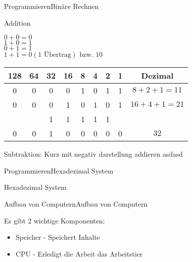 \begin{frame}{Programmieren}{Binäre Rechnen}
	
	Addition %

	$0 + 0 = 0$	\\
	$1 + 0 = 1$	\\
	$0 + 1 = 1$	\\
	$1 + 1 = 0 (1 \text{ Übertrag}) \text{ bzw. } 10$	
	
	 
	\begin{tabular}{cccccccc|c}
		128 & 64 & 32 & 16 & 8 & 4 & 2 & 1 & Dezimal \\ \hline 
		0   & 0  & 0  & 0  & 1 & 0 & 1 & 1 & $8 + 2 + 1 = 11$ \\ 
		0   & 0  & 0  & 1  & 0 & 1 & 0 & 1 & $16 + 4 + 1 = 21$ \\ \hline
		    &    & 1  & 1  & 1 & 1 & 1 &   &  \\
		0   & 0  & 1  & 0  & 0 & 0 & 0 & 0 & $32$ \\
		\hline 
	\end{tabular}
	 
	 
	
	
	Subtraktion:
	Kurz mit negativ darstellung addieren
	asdasd

\end{frame}


\begin{frame}{Programmieren}{Hexadezimal System}
		
	Hexadezimal System

\end{frame}




\begin{frame}{Aufbau von Computern}{Aufbau von Computern}
		
	Es gibt 2 wichtige Komponenten:
	\begin{itemize}
	\item Speicher - Speichert Inhalte
	\item CPU - Erledigt die Arbeit das Arbeitstier
	\end{itemize}
	
	
\end{frame}


